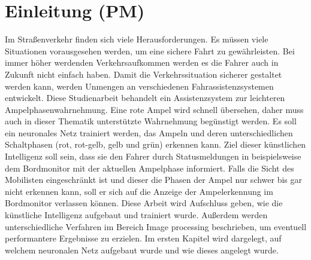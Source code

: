 \documentclass[a4paper,oneside,12pt]{report}
\begin{document}
	
	
	\tableofcontents
	\cleardoublepage
	
	
	\chapter{Einleitung (PM)}
	\begin{onehalfspace}
		Im Straßenverkehr finden sich viele Herausforderungen. Es müssen viele Situationen vorausgesehen werden, um eine sichere Fahrt zu gewährleisten. Bei immer höher werdenden Verkehrsaufkommen werden es die Fahrer auch in Zukunft nicht einfach haben. Damit die Verkehrssituation sicherer gestaltet werden kann, werden Unmengen an verschiedenen Fahrassistenzsystemen entwickelt. Diese Studienarbeit behandelt ein Assistenzsystem zur leichteren Ampelphasenwahrnehmung. Eine rote Ampel wird schnell übersehen, daher muss auch in dieser Thematik unterstützte Wahrnehmung begünstigt werden. Es soll ein neuronales Netz trainiert werden, das Ampeln und deren unterschiedlichen Schaltphasen (rot, rot-gelb, gelb und grün) erkennen kann. Ziel dieser künstlichen Intelligenz soll sein, dass sie den Fahrer durch Statusmeldungen in beispielsweise dem Bordmonitor mit der aktuellen Ampelphase informiert. Falls die Sicht des Mobilisten eingeschränkt ist und dieser die Phasen der Ampel nur schwer bis gar nicht erkennen kann, soll er sich auf die Anzeige der Ampelerkennung im Bordmonitor verlassen können. Diese Arbeit wird Aufschluss geben, wie die künstliche Intelligenz aufgebaut und trainiert wurde. Außerdem werden unterschiedliche Verfahren im Bereich Image processing beschrieben, um eventuell performantere Ergebnisse zu erzielen. Im ersten Kapitel wird dargelegt, auf welchem neuronalen Netz aufgebaut wurde und wie dieses angelegt wurde.
	\end{onehalfspace}
\end{document}
